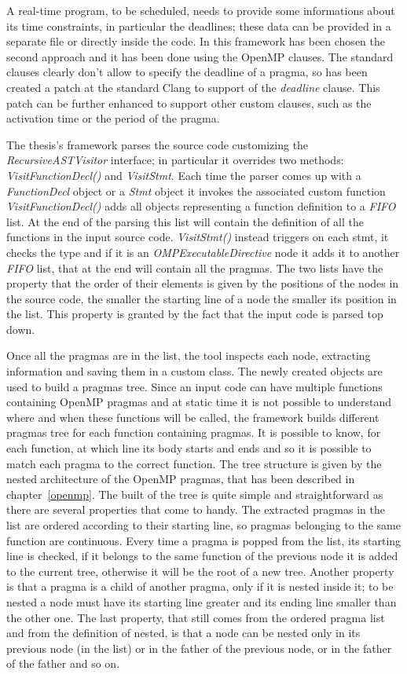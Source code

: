 \documentclass[a4paper,11pt,oneside]{book}
\begin{document}
A real-time program, to be scheduled, needs to provide some informations about its time constraints, in particular the deadlines; these data can be provided in a separate file or directly inside the code. In this framework has been chosen the second approach and it has been done using the OpenMP clauses. The standard clauses clearly don’t allow to specify the deadline of a pragma, so has been created a patch at the standard Clang to support of the \emph{deadline} clause. This patch can be further enhanced to support other custom clauses, such as the activation time or the period of the pragma.

The thesis’s framework parses the source code customizing the \emph{RecursiveASTVisitor} interface; in particular it overrides two methods: \emph{VisitFunctionDecl()} and \emph{VisitStmt}. Each time the parser comes up with a \emph{FunctionDecl} object or a \emph{Stmt} object it invokes the associated custom function \emph{VisitFunctionDecl()} adds all objects representing a function definition to a \emph{FIFO} list.  At the end of the parsing this list will contain the definition of all the functions in the input source code. \emph{VisitStmt()} instead triggers on each stmt, it checks the type and if it is an \emph{OMPExecutableDirective} node it adds it to another \emph{FIFO} list, that at the end will contain all the pragmas. The two lists have the property that the order of their elements is given by the positions of the nodes in the source code, the smaller the starting line of a node the smaller its position in the list. This property is granted by the fact that the input code is parsed top down.

Once all the pragmas are in the list, the tool inspects each node, extracting information and saving them in a custom class. The newly created objects are used to build a pragmas tree. Since an input code can have multiple functions containing OpenMP pragmas and at static time it is not possible to understand where and when these functions will be called, the framework builds different pragmas tree for each function containing pragmas. It is possible to know, for each function, at which line its body starts and ends and so it is possible to match each pragma to the correct function. The tree structure is given by the nested architecture of the OpenMP pragmas, that has been described in chapter~\ref{openmp}. The built of the tree is quite simple and straightforward as there are several properties that come to handy. The extracted pragmas in the list are ordered according to their starting line, so pragmas belonging to the same function are continuous. Every time a pragma is popped from the list, its starting line is checked, if it belongs to the same function of the previous node it is added to the current tree, otherwise it will be the root of a new tree. Another property is that a pragma is a child of another pragma, only if it is nested inside it; to be nested a node must have its starting line greater and its ending line smaller than the other one.  The last property, that still comes from the ordered pragma list and from the definition of nested, is that a node can be nested only in its previous node (in the list) or in the father of the previous node, or in the father of the father and so on.
\end{document}

